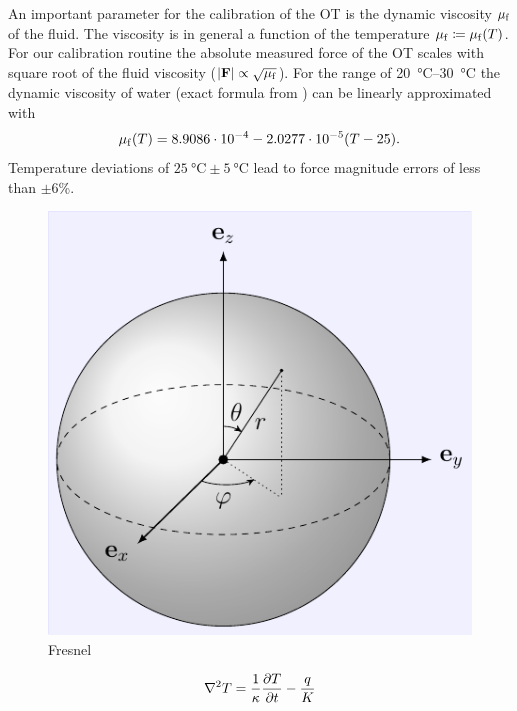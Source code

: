An important parameter for the calibration of the OT is the dynamic viscosity 
$\mu_{\mathrm{f}}$ of the fluid. The viscosity is in general a function of the temperature 
$\mu_{\mathrm{f}}\coloneqq\mu_{\mathrm{f}}(T)$. For our calibration routine the absolute measured 
force of the OT scales with square root of the fluid viscosity 
($\abs{\vb{F}}\propto\sqrt{\mu_{\mathrm{f}}}$). For the range of 
\SIrange{20}{30}{\degreeCelsius} the dynamic viscosity of water (exact formula 
from \cite{Peterman2003}) can be linearly approximated with
\begin{equation}
  \mu_{\mathrm{f}}(T) = 8.9086\cdot 10^{-4} -2.0277\cdot10^{-5} (T-25).
  \label{eq:Th-viscosity}
\end{equation}
Temperature deviations of $\SI{25}{\degreeCelsius}\pm\SI{5}{\degreeCelsius}$ 
lead to force magnitude errors of less than $\pm$6\%.



\begin{figure}[tbp]
  \centering
  \includegraphics[]{Plots/cache/coordinate.pdf}
  \caption{Fresnel}
  \label{fig:Th-coordinate}
\end{figure}



\begin{equation}
  \laplacian{T} = \frac{1}{\kappa} \pdv{T}{t} - \frac{q}{K}
  \label{eq:Th-heat-prob}
\end{equation}

